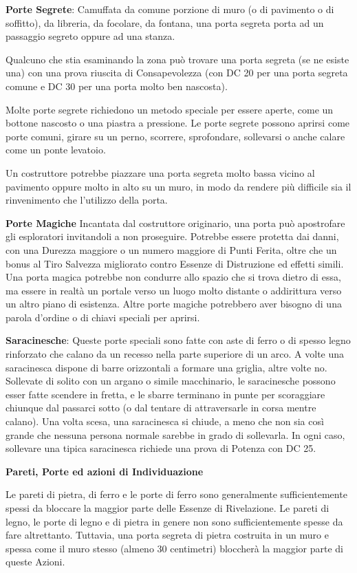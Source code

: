 \documentclass[a4paper,11pt,twoside,openany]{book}
\begin{document}
{\textbf{Porte Segrete}: Camuffata da comune porzione di muro (o di pavimento o di soffitto), da libreria, da focolare, da fontana, una porta segreta porta ad un passaggio segreto oppure ad una stanza.

Qualcuno che stia esaminando la zona può trovare una porta segreta (se ne esiste una) con una prova riuscita di Consapevolezza (con DC 20 per una porta segreta comune e DC 30 per una porta molto ben nascosta).

Molte porte segrete richiedono un metodo speciale per essere aperte, come un bottone nascosto o una piastra a pressione. Le porte segrete possono aprirsi come porte comuni, girare su un perno, scorrere, sprofondare, sollevarsi o anche calare come un ponte levatoio.

Un costruttore potrebbe piazzare una porta segreta molto bassa vicino al pavimento oppure molto in alto su un muro, in modo da rendere più difficile sia il rinvenimento che l'utilizzo della porta.

\textbf{Porte Magiche} Incantata dal costruttore originario, una porta può apostrofare gli esploratori invitandoli a non proseguire. Potrebbe essere protetta dai danni, con una Durezza maggiore o un numero maggiore di Punti Ferita, oltre che un bonus al Tiro Salvezza migliorato contro Essenze di Distruzione ed effetti simili. Una porta magica potrebbe non condurre allo spazio che si trova dietro di essa, ma essere in realtà un portale verso un luogo molto distante o addirittura verso un altro piano di esistenza. Altre porte magiche potrebbero aver bisogno di una parola d'ordine o di chiavi speciali per aprirsi.

\textbf{Saracinesche}: Queste porte speciali sono fatte con aste di ferro o di spesso legno rinforzato che calano da un recesso nella parte superiore di un arco. A volte una saracinesca dispone di barre orizzontali a formare una griglia, altre volte no. Sollevate di solito con un argano o simile macchinario, le saracinesche possono esser fatte scendere in fretta, e le sbarre terminano in punte per scoraggiare chiunque dal passarci sotto (o dal tentare di attraversarle in corsa mentre calano). Una volta scesa, una saracinesca si chiude, a meno che non sia così grande che nessuna persona normale sarebbe in grado di sollevarla. In ogni caso, sollevare una tipica saracinesca richiede una prova di Potenza con DC 25.

\textbf{Pareti, Porte ed azioni di Individuazione}

Le pareti di pietra, di ferro e le porte di ferro sono generalmente sufficientemente spessi da bloccare la maggior parte delle Essenze di Rivelazione. Le pareti di legno, le porte di legno e di pietra in genere non sono sufficientemente spesse da fare altrettanto. Tuttavia, una porta segreta di pietra costruita in un muro e spessa come il muro stesso (almeno 30 centimetri) bloccherà la maggior parte di queste Azioni.

}
\end{document}
